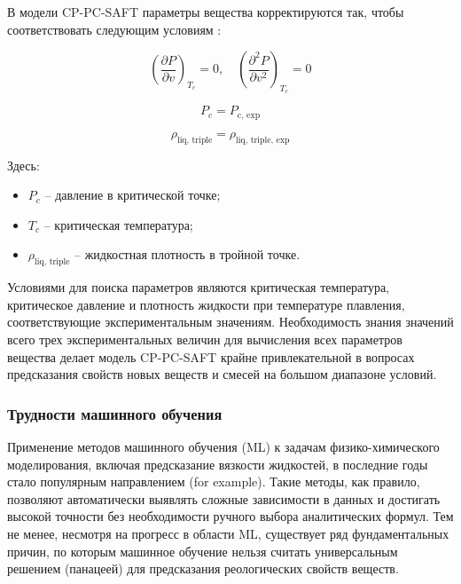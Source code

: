 \documentclass[a4paper,12pt]{article}
\begin{document}
В модели CP-PC-SAFT параметры вещества корректируются так, чтобы соответствовать следующим условиям \cite{polishuk2014standardized}:

\begin{equation}
\left( \frac{\partial P}{\partial v} \right)_{T_c} = 0, \quad
\left( \frac{\partial^2 P}{\partial v^2} \right)_{T_c} = 0
\end{equation}

\begin{equation}
P_c = P_{\text{c, exp}}
\end{equation}

\begin{equation}
\rho_{\text{liq, triple}} = \rho_{\text{liq, triple, exp}}
\end{equation}

Здесь:
\begin{itemize}
    \item \( P_c \) -- давление в критической точке;
    \item \( T_c \) -- критическая температура;
    \item \( \rho_{\text{liq, triple}} \) -- жидкостная плотность в тройной точке.
\end{itemize}

Условиями для поиска параметров являются критическая температура, критическое давление и плотность жидкости при температуре плавления, соответствующие экспериментальным значениям. Необходимость знания значений всего трех экспериментальных величин для вычисления всех параметров вещества делает модель CP-PC-SAFT крайне привлекательной в вопросах предсказания свойств новых веществ и смесей на большом диапазоне условий. 

\subsubsection{Трудности машинного обучения}

Применение методов машинного обучения (ML) к задачам физико-химического моделирования, включая предсказание вязкости жидкостей, в последние годы стало популярным направлением (for example). Такие методы, как правило, позволяют автоматически выявлять сложные зависимости в данных и достигать высокой точности без необходимости ручного выбора аналитических формул. Тем не менее, несмотря на прогресс в области ML, существует ряд фундаментальных причин, по которым машинное обучение нельзя считать универсальным решением (панацеей) для предсказания реологических свойств веществ.
\end{document}
